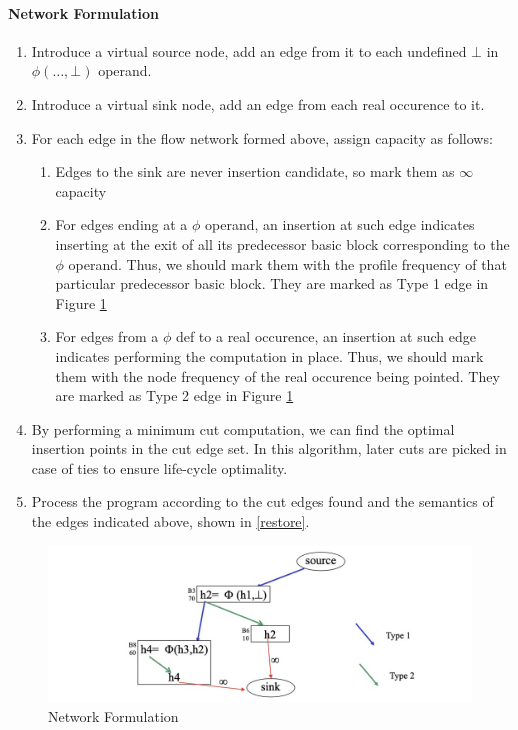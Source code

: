 \begin{exercise}[]
\begin{solution}
  \paragraph{Network Formulation}
  \begin{enumerate}
    \item Introduce a virtual source node, add an edge from it to each undefined $\bot$ in $\phi(\ldots,\bot)$ operand.
    \item Introduce a virtual sink node, add an edge from each real occurence to it.
    \item For each edge in the flow network formed above, assign capacity as follows:
    \begin{enumerate}
      \item Edges to the sink are never insertion candidate, so mark them as $\infty$ capacity
      \item For edges ending at a $\phi$ operand, an insertion at such edge indicates inserting at the exit of all its predecessor basic block corresponding to the $\phi$ operand. Thus, we should mark them with the profile frequency of that particular predecessor basic block. They are marked as Type 1 edge in Figure \ref{flow}
      \item For edges from a $\phi$ def to a real occurence, an insertion at such edge indicates performing the computation in place. Thus, we should mark them with the node frequency of the real occurence being pointed. They are marked as Type 2 edge in Figure \ref{flow}
    \end{enumerate}
      \item By performing a minimum cut computation, we can find the optimal insertion points in the cut edge set. In this algorithm, later cuts are picked in case of ties to ensure life-cycle optimality.
      \item Process the program according to the cut edges found and the semantics of the edges indicated above, shown in \ref{restore}.
  \end{enumerate}


  \begin{figure}
    \centering
    \includegraphics[width=12cm]{img/ex6-flow.jpg}
    \caption{Network Formulation}
    \label{flow}
  \end{figure}


\end{solution}
\end{exercise}
